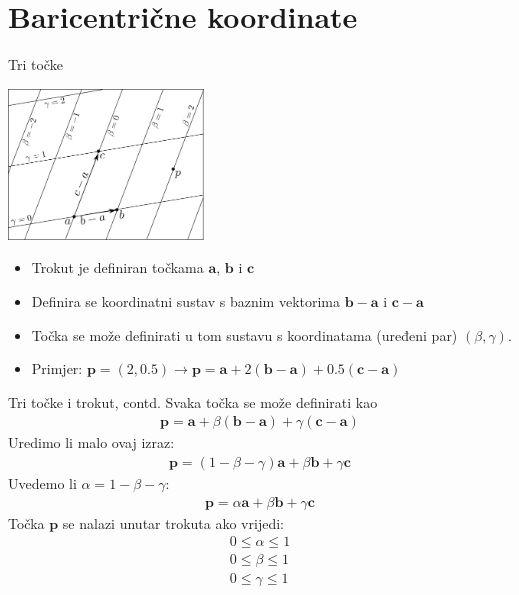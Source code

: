 \documentclass[9pt]{beamer}
\begin{document}
\section{Baricentrične koordinate}
\begin{frame}{Tri točke}
	\begin{center}
		\includegraphics[height=4cm]{./slike/2d_trokut.png}
	\end{center}
	\begin{itemize}
		\item Trokut je definiran točkama $\mathbf{a}$, $\mathbf{b}$ i $\mathbf{c}$
		\item Definira se koordinatni sustav s baznim vektorima $\mathbf{b} - \mathbf{a}$ i $\mathbf{c} - \mathbf{a}$
		\item Točka se može definirati u tom sustavu s koordinatama (uređeni par) $(\beta, \gamma)$.
		\item Primjer: $\mathbf{p} = (2, 0.5) \rightarrow \mathbf{p} = \mathbf{a} + 2(\mathbf{b} - \mathbf{a}) + 0.5(\mathbf{c} - \mathbf{a}) $
	\end{itemize}
	
\end{frame}
\begin{frame}{Tri točke i trokut, contd.}
	Svaka točka se može definirati kao 
	\begin{align*}
	\mathbf{p} = \mathbf{a} + \beta(\mathbf{b} - \mathbf{a}) + \gamma(\mathbf{c} - \mathbf{a})
	\end{align*}
	Uredimo li malo ovaj izraz:
	\begin{align*}
	\mathbf{p} = (1- \beta - \gamma)\mathbf{a} + \beta\mathbf{b} + \gamma\mathbf{c}
	\end{align*}
	Uvedemo li $\alpha = 1- \beta - \gamma$:
	\begin{align*}
	\mathbf{p} = \alpha\mathbf{a} + \beta\mathbf{b} + \gamma\mathbf{c}
	\end{align*}
	Točka $\mathbf{p}$ se nalazi unutar trokuta ako vrijedi:
	\begin{align*}
	0 \leq \alpha \leq 1 \\
	0 \leq \beta \leq 1 \\
	0 \leq \gamma \leq 1 \\
	\end{align*}
\end{frame}
\end{document}
